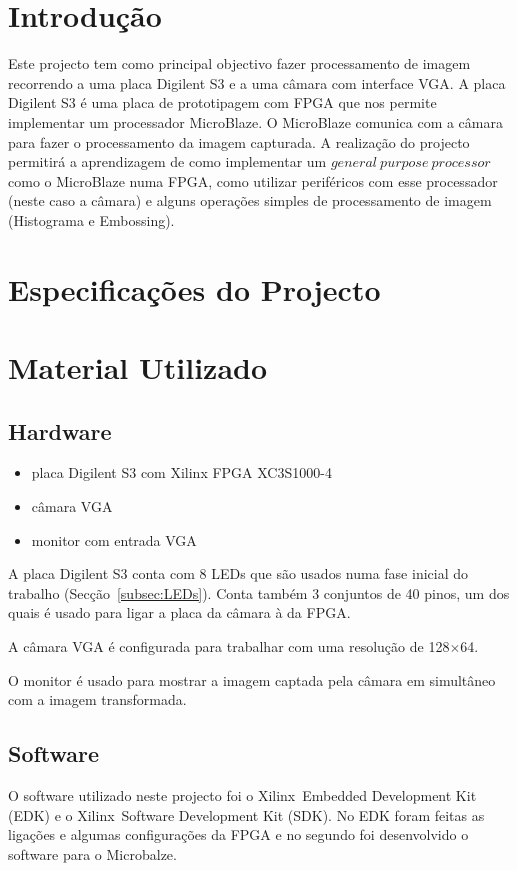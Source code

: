 \documentclass[a4paper]{article}
\begin{document}


\tableofcontents
\pagebreak

\section{Introdução}
Este projecto tem como principal objectivo fazer processamento de imagem recorrendo a uma placa Digilent S3 e a uma câmara com interface VGA. A placa Digilent S3 é uma placa de prototipagem com FPGA que nos permite implementar um processador MicroBlaze. O MicroBlaze comunica com a câmara para fazer o processamento da imagem capturada. A realização do projecto permitirá a aprendizagem de como implementar um $general\ purpose\ processor$ como o MicroBlaze numa FPGA, como utilizar periféricos com esse processador (neste caso a câmara) e alguns operações simples de processamento de imagem (Histograma e Embossing).


\section{Especificações do Projecto}

\section{Material Utilizado}
\subsection*{Hardware}
\begin{itemize}
\item placa Digilent S3 com Xilinx FPGA XC3S1000-4
\item câmara VGA
\item monitor com entrada VGA
\end{itemize}

A placa Digilent S3 conta com 8 LEDs que são usados numa fase inicial do trabalho (Secção~\ref{subsec:LEDs}). Conta também 3 conjuntos de 40 pinos, um dos quais é usado para ligar a placa da câmara à da FPGA.

A câmara VGA é configurada para trabalhar com uma resolução de 128$\times$64.

O monitor é usado para mostrar a imagem captada pela câmara em simultâneo com a imagem transformada.

\subsection*{Software}
O software utilizado neste projecto foi o Xilinx\textregistered\ Embedded Development Kit (EDK) e o Xilinx\textregistered\ Software Development Kit (SDK). No EDK foram feitas as ligações e algumas configurações da FPGA e no segundo foi desenvolvido o software para o Microbalze.
\end{document}

